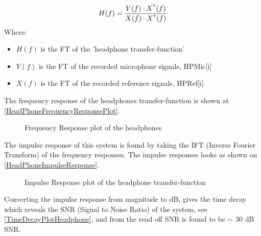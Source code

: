 \begin{equation}\label{FrequencyResponseEq2}
H(f) = \frac{Y(f) \cdot X\textsuperscript{*}(f)}{X(f) \cdot X\textsuperscript{*}(f)}
\end{equation}
Where:
\begin{itemize}
	\item $H(f)$ is the FT of the 'headphone transfer-function'
	\item $Y(f)$ is the FT of the recorded microphone signals, HPMic[i]
	\item $X(f)$ is the FT of the recorded reference signals, HPRef[i]
\end{itemize}


The frequency response of the headphones transfer-function is shown at \autoref{HeadPhoneFrequencyResponsePlot}.

\begin{figure}[H]
	\centering
	
	\caption{Frequency Response plot of the headphones}
	\label{HeadPhoneFrequencyResponsePlot}
\end{figure}



The impulse response of this system is found by taking the IFT (Inverse Fourier Transform) of the frequency responses.
The impulse responses looks as shown on \autoref{HeadPhoneImpulseResponse}.


\begin{figure}[H]
	\centering
	
	\caption{Impulse Response plot of the headphone transfer-function }
	\label{HeadPhoneImpulseResponse}
\end{figure}

%	

Converting the impulse response from magnitude to dB, gives the time decay which reveals the SNR (Signal to Noise Ratio) of the system, see \autoref{TimeDecayPlotHeadphone}, and from the read off SNR is found to be $\sim$ 30 dB SNR.

